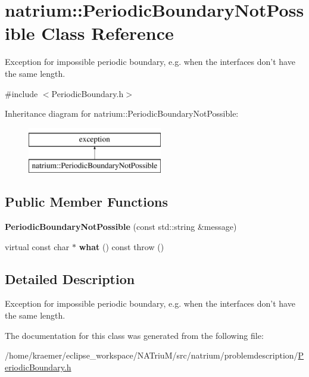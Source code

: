 \hypertarget{classnatrium_1_1PeriodicBoundaryNotPossible}{\section{natrium\-:\-:Periodic\-Boundary\-Not\-Possible Class Reference}
\label{classnatrium_1_1PeriodicBoundaryNotPossible}
}


Exception for impossible periodic boundary, e.\-g. when the interfaces don't have the same length.  




{\ttfamily \#include $<$Periodic\-Boundary.\-h$>$}

Inheritance diagram for natrium\-:\-:Periodic\-Boundary\-Not\-Possible\-:\begin{figure}[H]
\begin{center}
\leavevmode
\includegraphics[height=2.000000cm]{classnatrium_1_1PeriodicBoundaryNotPossible}
\end{center}
\end{figure}
\subsection*{Public Member Functions}
\begin{DoxyCompactItemize}
\item 
\hypertarget{classnatrium_1_1PeriodicBoundaryNotPossible_ab054fc017eaa7ce6f22c0cd95a2e4462}{{\bfseries Periodic\-Boundary\-Not\-Possible} (const std\-::string \&message)}\label{classnatrium_1_1PeriodicBoundaryNotPossible_ab054fc017eaa7ce6f22c0cd95a2e4462}

\item 
\hypertarget{classnatrium_1_1PeriodicBoundaryNotPossible_a982e2b40882757dc899bd4d82d643aa2}{virtual const char $\ast$ {\bfseries what} () const   throw ()}\label{classnatrium_1_1PeriodicBoundaryNotPossible_a982e2b40882757dc899bd4d82d643aa2}

\end{DoxyCompactItemize}


\subsection{Detailed Description}
Exception for impossible periodic boundary, e.\-g. when the interfaces don't have the same length. 

The documentation for this class was generated from the following file\-:\begin{DoxyCompactItemize}
\item 
/home/kraemer/eclipse\-\_\-workspace/\-N\-A\-Triu\-M/src/natrium/problemdescription/\hyperlink{PeriodicBoundary_8h}{Periodic\-Boundary.\-h}\end{DoxyCompactItemize}
